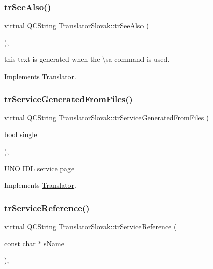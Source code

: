 \subsubsection{\texorpdfstring{trSeeAlso()}{trSeeAlso()}}
{\footnotesize\ttfamily virtual \mbox{\hyperlink{class_q_c_string}{Q\+C\+String}} Translator\+Slovak\+::tr\+See\+Also (\begin{DoxyParamCaption}{ }\end{DoxyParamCaption})\hspace{0.3cm}{\ttfamily [inline]}, {\ttfamily [virtual]}}

this text is generated when the \textbackslash{}sa command is used. 

Implements \mbox{\hyperlink{class_translator}{Translator}}.

\mbox{\label{class_translator_slovak_a576fca16e73315ad769a601f8652d000}} 
\subsubsection{\texorpdfstring{trServiceGeneratedFromFiles()}{trServiceGeneratedFromFiles()}}
{\footnotesize\ttfamily virtual \mbox{\hyperlink{class_q_c_string}{Q\+C\+String}} Translator\+Slovak\+::tr\+Service\+Generated\+From\+Files (\begin{DoxyParamCaption}\item[{bool}]{single }\end{DoxyParamCaption})\hspace{0.3cm}{\ttfamily [inline]}, {\ttfamily [virtual]}}

U\+NO I\+DL service page 

Implements \mbox{\hyperlink{class_translator}{Translator}}.

\mbox{\label{class_translator_slovak_a2894e1ee715c53aff527fc7ea55e56f3}} 
\subsubsection{\texorpdfstring{trServiceReference()}{trServiceReference()}}
{\footnotesize\ttfamily virtual \mbox{\hyperlink{class_q_c_string}{Q\+C\+String}} Translator\+Slovak\+::tr\+Service\+Reference (\begin{DoxyParamCaption}\item[{const char $\ast$}]{s\+Name }\end{DoxyParamCaption})\hspace{0.3cm}{\ttfamily [inline]}, {\ttfamily [virtual]}}

